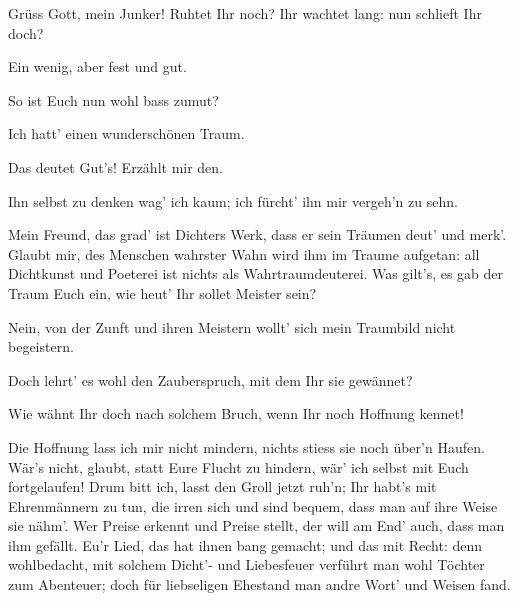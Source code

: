 \begin{drama}
\scene


\Sachsspeaks
Grüss Gott, mein Junker! Ruhtet Ihr noch?
Ihr wachtet lang: nun schlieft Ihr doch?

\Waltherspeaks


Ein wenig, aber fest und gut.

\Sachsspeaks
So ist Euch nun wohl bass zumut?

\Waltherspeaks


Ich hatt' einen wunderschönen Traum.

\Sachsspeaks
Das deutet Gut's! Erzählt mir den.

\Waltherspeaks
Ihn selbst zu denken wag' ich kaum;
ich fürcht' ihn mir vergeh'n zu sehn.

\Sachsspeaks
Mein Freund, das grad' ist Dichters Werk,
dass er sein Träumen deut' und merk'.
Glaubt mir, des Menschen wahrster Wahn
wird ihm im Traume aufgetan:
all Dichtkunst und Poeterei
ist nichts als Wahrtraumdeuterei.
Was gilt's, es gab der Traum Euch ein,
wie heut' Ihr sollet Meister sein?

\Waltherspeaks


Nein, von der Zunft und ihren Meistern
wollt' sich mein Traumbild nicht begeistern.

\Sachsspeaks
Doch lehrt' es wohl den Zauberspruch,
mit dem Ihr sie gewännet?

\Waltherspeaks


Wie wähnt Ihr doch nach solchem Bruch,
wenn Ihr noch Hoffnung kennet!

\Sachsspeaks
Die Hoffnung lass ich mir nicht mindern,
nichts stiess sie noch über'n Haufen.
Wär's nicht, glaubt, statt Eure Flucht zu hindern,
wär' ich selbst mit Euch fortgelaufen!
Drum bitt ich, lasst den Groll jetzt ruh'n;
Ihr habt's mit Ehrenmännern zu tun,
die irren sich und sind bequem,
dass man auf ihre Weise sie nähm'.
Wer Preise erkennt und Preise stellt,
der will am End' auch, dass man ihm gefällt.
Eu'r Lied, das hat ihnen bang gemacht;
und das mit Recht:
denn wohlbedacht,
mit solchem Dicht'- und Liebesfeuer
verführt man wohl Töchter zum Abenteuer;
doch für liebseligen Ehestand
man andre Wort' und Weisen fand.


\end{drama}
